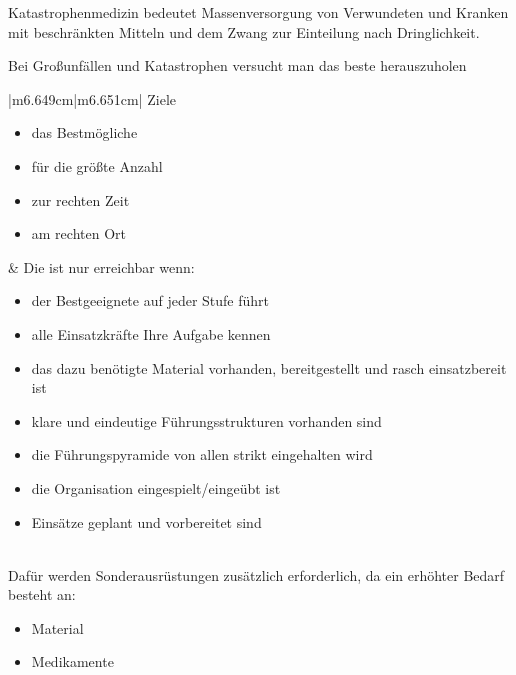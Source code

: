 \documentclass{article}
\begin{document}
Katastrophenmedizin bedeutet Massenversorgung von Verwundeten und
Kranken mit beschr\"ankten Mitteln und dem Zwang zur Einteilung nach
Dringlichkeit.

Bei Gro{\ss}unf\"allen und Katastrophen versucht man das beste
herauszuholen

\begin{center}
\tablehead{}\begin{supertabular}{|m{6.649cm}|m{6.651cm}|}
\hline
Ziele

\begin{itemize}
\item das Bestm\"ogliche

\item f\"ur die gr\"o{\ss}te Anzahl

\item zur rechten Zeit

\item am rechten Ort

\end{itemize}
 &
Die ist nur erreichbar wenn:

\begin{itemize}
\item der Bestgeeignete auf jeder Stufe f\"uhrt

\item alle Einsatzkr\"afte Ihre Aufgabe kennen 

\item das dazu ben\"otigte Material vorhanden, bereitgestellt und rasch
einsatzbereit ist

\item klare und eindeutige F\"uhrungsstrukturen vorhanden sind

\item die F\"uhrungspyramide von allen strikt eingehalten wird

\item die Organisation eingespielt/einge\"ubt ist

\item Eins\"atze geplant und vorbereitet sind

\end{itemize}
\\\hline
Daf\"ur werden Sonderausr\"ustungen zus\"atzlich erforderlich, da ein
erh\"ohter Bedarf besteht an:

\begin{itemize}
\item Material

\item Medikamente


\end{itemize}
\end{supertabular}
\end{center}
\end{document}
